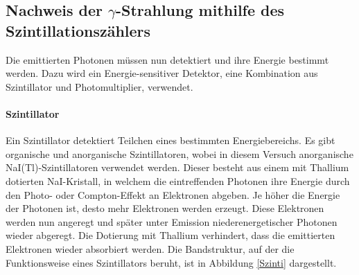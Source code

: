  \subsection{Nachweis der $\gamma$-Strahlung mithilfe des Szintillationszählers}
 Die emittierten Photonen müssen nun detektiert und ihre Energie bestimmt werden. Dazu wird ein Energie-sensitiver Detektor, eine Kombination aus Szintillator und Photomultiplier, verwendet.
 \paragraph{Szintillator} Ein Szintillator detektiert Teilchen eines bestimmten Energiebereichs. Es gibt organische und anorganische Szintillatoren, wobei in diesem Versuch anorganische NaI(Tl)-Szintillatoren verwendet werden. Dieser besteht aus einem mit Thallium dotierten NaI-Kristall, in welchem die eintreffenden Photonen ihre Energie durch den Photo- oder Compton-Effekt an Elektronen abgeben. Je höher die Energie der Photonen ist, desto mehr Elektronen werden erzeugt. Diese Elektronen werden nun angeregt und später unter Emission  niederenergetischer Photonen wieder abgeregt. Die Dotierung mit Thallium verhindert, dass die emittierten Elektronen wieder absorbiert werden. Die Bandstruktur, auf der die Funktionsweise eines Szintillators beruht, ist in Abbildung \ref{Szinti} dargestellt.\cite{szinti}
 
